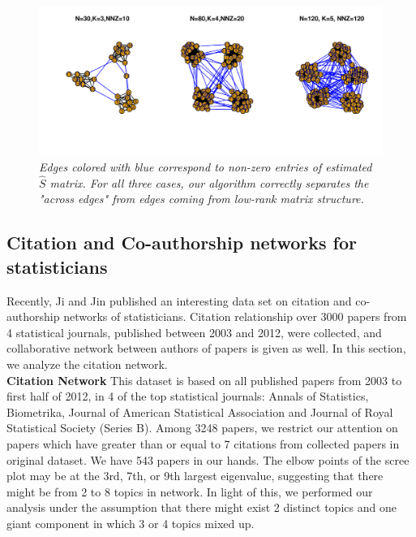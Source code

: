 \documentclass{article}
\begin{document}
\begin{figure}[b]
\begin{center}
\includegraphics[scale=0.75]{Fig2.pdf}
\caption{\it Edges colored with blue correspond to non-zero entries of estimated $\hat{S}$ matrix. For all three cases, our algorithm correctly separates the "across edges" from edges coming from low-rank matrix structure.}
\end{center}
\label{fig:figure2}
\end{figure}

\subsection{Citation and Co-authorship networks for statisticians }
Recently, Ji and Jin \cite{ji2016coauthorship} published an interesting data set on citation  and co-authorship networks of statisticians. Citation relationship over 3000 papers from 4 statistical journals, published between 2003 and 2012, were collected, and collaborative network between authors of papers is given as well. In this section, we analyze the citation network. \\ 

\noindent\textbf{Citation Network} This dataset is based on all published papers from 2003 to first half of 2012, in 4 of the top statistical journals: Annals of Statistics, Biometrika, Journal of American Statistical Association and Journal of Royal Statistical Society (Series B). Among  3248 papers, we restrict our attention on papers which have greater than or equal to 7 citations from collected papers in original dataset. We have 543 papers in our hands. The elbow points of the scree plot may be at the 3rd, 7th, or 9th largest eigenvalue, suggesting that there might be from 2 to 8 topics in network. In light of this, we performed our analysis under the assumption that there might exist 2 distinct topics and one giant component in which 3 or 4 topics mixed up. \\
\end{document}
